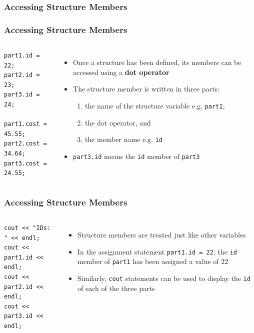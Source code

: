 \documentclass{beamer}
\begin{document}
\begin{frame}[fragile]
    \frametitle{Accessing Structure Members}
    \subsubsection{Accessing Structure Members} %
    \label{ssub:accessing_structure_members}
    \begin{columns}
        \lstset{style=mystyle}
\begin{lstlisting}
part1.id = 22;
part2.id = 23;
part3.id = 24;

part1.cost = 45.55;
part2.cost = 34.64;
part3.cost = 24.55;
\end{lstlisting}
            \begin{itemize}
            \item Once a structure has been defined, its members can be accessed using a \textbf{dot operator}
            \item The structure member is written in three parts:
            \begin{enumerate}
                \item the name of the structure variable e.g. \texttt{part1},
                \item the dot operator, and
                \item the member name e.g. \texttt{id}
            \end{enumerate}
            \item \texttt{part3.id} means the \texttt{id} member of \texttt{part3}
            \end{itemize}
    \end{columns}
\end{frame}

\begin{frame}[fragile]
    \frametitle{Accessing Structure Members}
    \begin{columns}
        \lstset{style=mystyle}
\begin{lstlisting}
cout << "IDs: " << endl;
cout << part1.id << endl;
cout << part2.id << endl;
cout << part3.id << endl;

\end{lstlisting}
            \begin{itemize}
            \item Structure members are treated just like other variables
            \item In the assignment statement \texttt{part1.id = 22}, the \texttt{id} member of \texttt{part1} has been assigned a value of 22
            \item Similarly, \texttt{cout} statements can be used to display the \texttt{id} of each of the three parts
            \end{itemize}
    \end{columns}
\end{frame}
\end{document}
